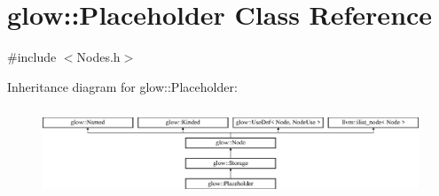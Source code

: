 \hypertarget{classglow_1_1_placeholder}{}\section{glow\+:\+:Placeholder Class Reference}
\label{classglow_1_1_placeholder}


{\ttfamily \#include $<$Nodes.\+h$>$}

Inheritance diagram for glow\+:\+:Placeholder\+:\begin{figure}[H]
\begin{center}
\leavevmode
\includegraphics[height=2.705314cm]{classglow_1_1_placeholder}
\end{center}
\end{figure}
